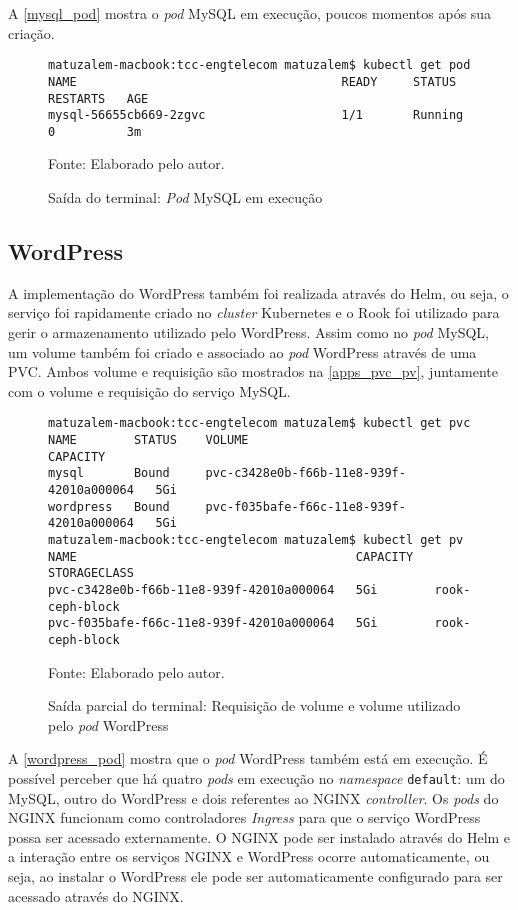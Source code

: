 A \autoref{mysql_pod} mostra o \textit{pod} MySQL em execução, poucos momentos após sua criação.

\begin{figure}[!htpb]
	\centering
	\caption{Saída do terminal: \textit{Pod} MySQL em execução}
    \begin{verbatim}
matuzalem-macbook:tcc-engtelecom matuzalem$ kubectl get pod
NAME                                     READY     STATUS    RESTARTS   AGE
mysql-56655cb669-2zgvc                   1/1       Running   0          3m
    \end{verbatim}
    
	Fonte: Elaborado pelo autor.
 	\label{mysql_pod}
\end{figure}

\subsection{WordPress}

A implementação do WordPress também foi realizada através do Helm, ou seja, o serviço foi rapidamente criado no \textit{cluster} Kubernetes e o Rook foi utilizado para gerir o armazenamento utilizado pelo WordPress. Assim como no \textit{pod} MySQL, um volume também foi criado e associado ao \textit{pod} WordPress através de uma \ac{PVC}. Ambos volume e requisição são mostrados na \autoref{apps_pvc_pv}, juntamente com o volume e requisição do serviço MySQL.

\begin{figure}[!htpb]
	\centering
	\caption{Saída parcial do terminal: Requisição de volume e volume utilizado pelo \textit{pod} WordPress}
    \begin{verbatim}
matuzalem-macbook:tcc-engtelecom matuzalem$ kubectl get pvc
NAME        STATUS    VOLUME                                     CAPACITY
mysql       Bound     pvc-c3428e0b-f66b-11e8-939f-42010a000064   5Gi
wordpress   Bound     pvc-f035bafe-f66c-11e8-939f-42010a000064   5Gi
matuzalem-macbook:tcc-engtelecom matuzalem$ kubectl get pv
NAME                                       CAPACITY   STORAGECLASS
pvc-c3428e0b-f66b-11e8-939f-42010a000064   5Gi        rook-ceph-block
pvc-f035bafe-f66c-11e8-939f-42010a000064   5Gi        rook-ceph-block
    \end{verbatim}
	Fonte: Elaborado pelo autor.
 	\label{apps_pvc_pv}
\end{figure}

A \autoref{wordpress_pod} mostra que o \textit{pod} WordPress também está em execução. É possível perceber que há quatro \textit{pods} em execução no \textit{namespace} \texttt{default}: um do MySQL, outro do WordPress e dois referentes ao NGINX \textit{controller}. Os \textit{pods} do NGINX funcionam como controladores \textit{Ingress} para que o serviço WordPress possa ser acessado externamente. O NGINX pode ser instalado através do Helm e a interação entre os serviços NGINX e WordPress ocorre automaticamente, ou seja, ao instalar o WordPress ele pode ser automaticamente configurado para ser acessado através do NGINX.

